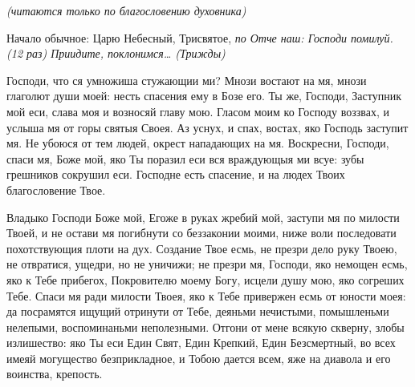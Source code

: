 








 


\itshape (читаются только по благословению духовника)

\normalfont{}

Начало обычное: Царю Небесный,  Трисвятое,  \itshape по\normalfont{} Отче наш: Господи помилуй. (12 раз) Приидите, поклонимся… (\itshape Трижды\normalfont{})




Господи, что ся умножиша стужающии ми? Мнози востают на мя, мнози глаголют души моей: несть спасения ему в Бозе его. Ты же, Господи, Заступник мой еси, слава моя и возносяй главу мою. Гласом моим ко Господу воззвах, и услыша мя от горы святыя Своея. Аз уснух, и спах, востах, яко Господь заступит мя. Не убоюся от тем людей, окрест нападающих на мя. Воскресни, Господи, спаси мя, Боже мой, яко Ты поразил еси вся враждующыя ми всуе: зубы грешников сокрушил еси. Господне есть спасение, и на людех Твоих благословение Твое.




Владыко Господи Боже мой, Егоже в руках жребий мой, заступи мя по милости Твоей, и не остави мя погибнути со беззаконии моими, ниже воли последовати похотствующия плоти на дух. Создание Твое есмь, не презри дело руку Твоею, не отвратися, ущедри, но не уничижи;  не презри мя, Господи, яко немощен есмь, яко к Тебе прибегох, Покровителю моему Богу, исцели душу мою, яко согреших Тебе. Спаси мя ради милости Твоея, яко к Тебе привержен есмь от юности моея: да посрамятся ищущий отринути от Тебе, деяньми нечистыми, помышленьми  нелепыми,  воспоминаньми неполезными. Отгони от мене всякую скверну, злобы излишество: яко Ты еси Един Свят, Един Крепкий, Един Безсмертный, во всех имеяй могущество безприкладное, и Тобою дается всем, яже на диавола и его воинства, крепость.

